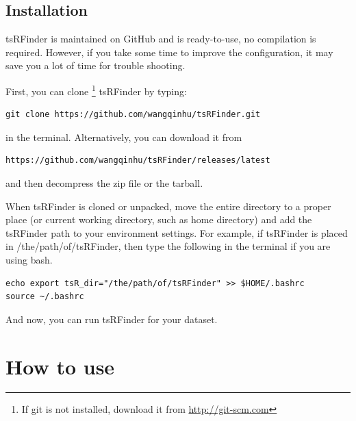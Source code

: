 \documentclass[11pt, a4paper]{article}
\begin{document}
\subsection{Installation}

tsRFinder is maintained on GitHub and is ready-to-use, no compilation is required. However, if you take some time to improve the configuration, it may save you a lot of time for trouble shooting.

First, you can clone \footnote{If git is not installed, download it from \url{http://git-scm.com}} tsRFinder by typing:

{\footnotesize \begin{tcolorbox}[colback=blue!5!white,colframe=blue!75!black,title=Clone tsRFinder]
\begin{verbatim}
git clone https://github.com/wangqinhu/tsRFinder.git
\end{verbatim}
\end{tcolorbox}}

in the terminal. Alternatively, you can download it from

{\footnotesize \begin{tcolorbox}[colback=blue!5!white,colframe=blue!75!black,title=Latest release of tsRFinder]
\begin{verbatim}
https://github.com/wangqinhu/tsRFinder/releases/latest
\end{verbatim}
\end{tcolorbox}}

and then decompress the zip file or the tarball.

When tsRFinder is cloned or unpacked, move the entire directory to a proper place (or current working directory, such as home directory) and add the tsRFinder path to your environment settings. For example, if tsRFinder is placed in /the/path/of/tsRFinder, then type the following in the terminal if you are using bash.


{\footnotesize \begin{tcolorbox}[colback=blue!5!white,colframe=blue!75!black,title=Setup tsRFinder]
\begin{verbatim}
echo export tsR_dir="/the/path/of/tsRFinder" >> $HOME/.bashrc
source ~/.bashrc
\end{verbatim}
\end{tcolorbox}}

And now, you can run tsRFinder for your dataset.

\section{How to use}
\end{document}
